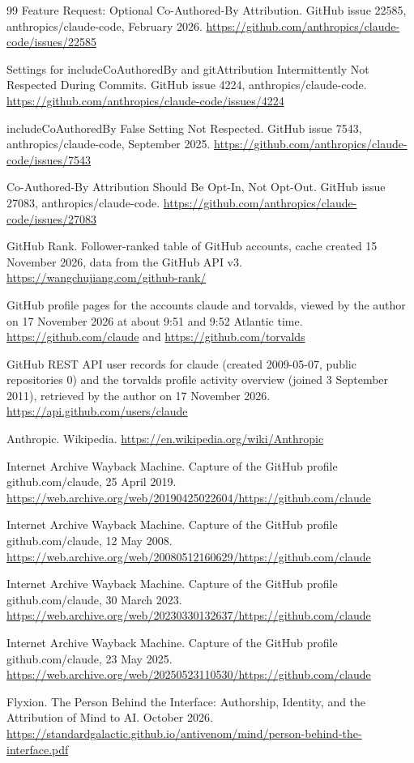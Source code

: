 \documentclass[11pt]{article}
\begin{document}
\begin{thebibliography}{99}
 Feature Request: Optional Co-Authored-By Attribution. GitHub issue 22585, anthropics/claude-code, February 2026. \url{https://github.com/anthropics/claude-code/issues/22585}

 Settings for includeCoAuthoredBy and gitAttribution Intermittently Not Respected During Commits. GitHub issue 4224, anthropics/claude-code. \url{https://github.com/anthropics/claude-code/issues/4224}

 includeCoAuthoredBy False Setting Not Respected. GitHub issue 7543, anthropics/claude-code, September 2025. \url{https://github.com/anthropics/claude-code/issues/7543}

 Co-Authored-By Attribution Should Be Opt-In, Not Opt-Out. GitHub issue 27083, anthropics/claude-code. \url{https://github.com/anthropics/claude-code/issues/27083}

 GitHub Rank. Follower-ranked table of GitHub accounts, cache created 15 November 2026, data from the GitHub API v3. \url{https://wangchujiang.com/github-rank/}

 GitHub profile pages for the accounts claude and torvalds, viewed by the author on 17 November 2026 at about 9:51 and 9:52 Atlantic time. \url{https://github.com/claude} and \url{https://github.com/torvalds}

 GitHub REST API user records for claude (created 2009-05-07, public repositories 0) and the torvalds profile activity overview (joined 3 September 2011), retrieved by the author on 17 November 2026. \url{https://api.github.com/users/claude}

 Anthropic. Wikipedia. \url{https://en.wikipedia.org/wiki/Anthropic}

 Internet Archive Wayback Machine. Capture of the GitHub profile github.com/claude, 25 April 2019. \url{https://web.archive.org/web/20190425022604/https://github.com/claude}

 Internet Archive Wayback Machine. Capture of the GitHub profile github.com/claude, 12 May 2008. \url{https://web.archive.org/web/20080512160629/https://github.com/claude}

 Internet Archive Wayback Machine. Capture of the GitHub profile github.com/claude, 30 March 2023. \url{https://web.archive.org/web/20230330132637/https://github.com/claude}

 Internet Archive Wayback Machine. Capture of the GitHub profile github.com/claude, 23 May 2025. \url{https://web.archive.org/web/20250523110530/https://github.com/claude}

 Flyxion. The Person Behind the Interface: Authorship, Identity, and the Attribution of Mind to AI. October 2026. \url{https://standardgalactic.github.io/antivenom/mind/person-behind-the-interface.pdf}

\end{thebibliography}
\end{document}
